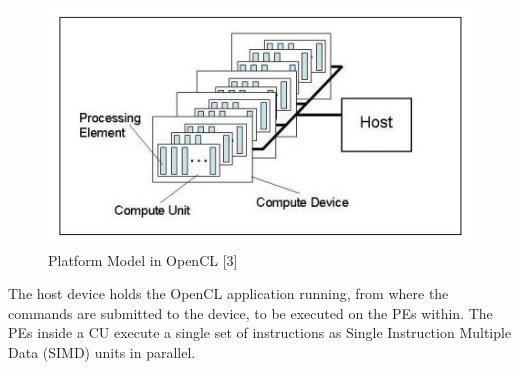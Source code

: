 \begin{figure}[h!]
  \includegraphics[width=\linewidth]{figures/OpenCL_Platform_Model.JPG}
  \caption{Platform Model in OpenCL [3]}
  \label{fig:opencl1}
\end{figure}
The host device holds the OpenCL application running, from where the commands are submitted to the device, to be executed on the PEs within. The PEs inside a CU execute a single set of instructions as Single Instruction Multiple Data (SIMD) units in parallel. 

